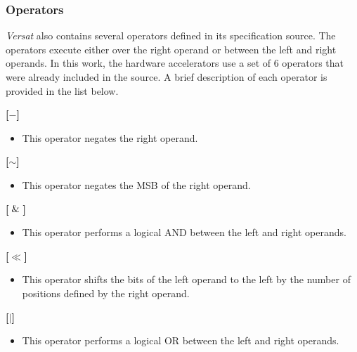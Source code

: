 \vspace{0.5cm}

\subsubsection{Operators}
\textit{Versat} also contains several operators defined in its specification source. The operators execute either over the right operand or between the left and right operands.
In this work, the hardware accelerators use a set of 6 operators that were already included in the source.
A brief description of each operator is provided in the list below.

\vspace{0.5cm}

\textbf{[$-$]}
\begin{itemize}
\item  This operator negates the right operand.
\end{itemize}

\vspace{0.5cm}

\textbf{[$\sim$]}
\begin{itemize}
\item  This operator negates the MSB of the right operand.
\end{itemize}

\vspace{0.5cm}

\textbf{[$\And$]}
\begin{itemize}
\item  This operator performs a logical AND between the left and right operands.
\end{itemize}

\vspace{0.5cm}

\textbf{[$\ll$]}
\begin{itemize}
\item  This operator shifts the bits of the left operand to the left by the number of positions defined by the right operand.
\end{itemize}

\vspace{0.5cm}

\textbf{[$\vert$]}
\begin{itemize}
\item This operator performs a logical OR between the left and right operands.
\end{itemize}

\vspace{0.5cm}

